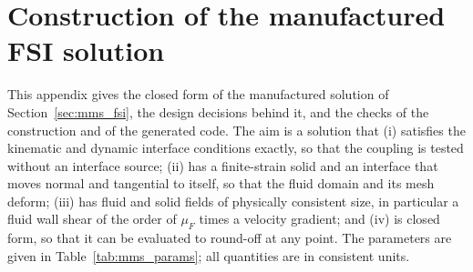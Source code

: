 \section{Construction of the manufactured FSI solution}
\label{app:mms}


This appendix gives the closed form of the manufactured solution of Section~\ref{sec:mms_fsi}, the design decisions behind it, and the checks of the construction and of the generated code.
The aim is a solution that (i) satisfies the kinematic and dynamic interface conditions exactly, so that the coupling is tested without an interface source; (ii) has a finite-strain solid and an interface that moves normal and tangential to itself, so that the fluid domain and its mesh deform; (iii) has fluid and solid fields of physically consistent size, in particular a fluid wall shear of the order of $\mu_F$ times a velocity gradient; and (iv) is closed form, so that it can be evaluated to round-off at any point.
The parameters are given in Table~\ref{tab:mms_params}; all quantities are in consistent units.

